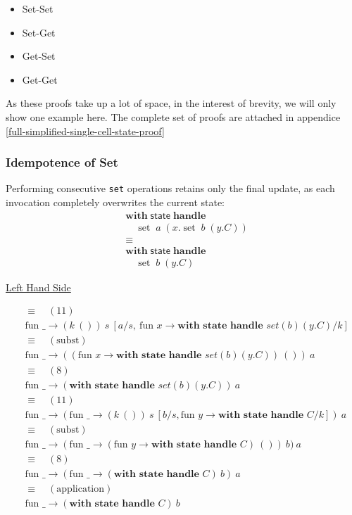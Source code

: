 \documentclass[logo,bsc,singlespacing,parskip]{infthesis}
\begin{document}
\begin{itemize}
    \item Set-Set 
    \item Set-Get
    \item Get-Set
    \item Get-Get
\end{itemize}

As these proofs take up a lot of space, in the interest of brevity, we will only show one example here. The complete set of proofs are attached in appendice \ref{full-simplified-single-cell-state-proof} 

\subsubsection*{Idempotence of Set}
Performing consecutive \lstinline{set} operations retains only the final update, as each invocation completely overwrites the current state:
\[
\begin{aligned}
    &\mathsf{\textbf{with}} \; \mathsf{state} \; \mathsf{\textbf{handle}} \\
    &\quad \operatorname{set} \; a \; (x. \operatorname{set} \; b \; (y. C)) \\
    &\equiv \\
    &\mathsf{\textbf{with}} \; \mathsf{state} \; \mathsf{\textbf{handle}} \\
    &\quad \operatorname{set} \; b \; (y. C)
\end{aligned}
\]

\underline{Left Hand Side}


\begin{align*}
&\equiv\quad (11) \\
&\text{fun } \_ \rightarrow (k\ ())\ s\ [a/s,\ \text{fun } x \rightarrow \textbf{with state handle } set(b)(y.C)/k] \\
&\equiv\quad (\text{subst}) \\
&\text{fun } \_ \rightarrow ((\text{fun } x \rightarrow \textbf{with state handle } set(b)(y.C))\ ())\ a \\
&\equiv\quad (8) \\
&\text{fun } \_ \rightarrow (\textbf{with state handle } set(b)(y.C))\ a \\
&\equiv\quad (11) \\
&\text{fun } \_ \rightarrow (\text{fun } \_ \rightarrow (k\ ())\ s\ [b/s, \text{fun } y \rightarrow \textbf{with state handle } C/k])\ a \\
&\equiv\quad (\text{subst}) \\
&\text{fun } \_ \rightarrow (\text{fun } \_ \rightarrow (\text{fun } y \rightarrow \textbf{with state handle } C)\ ())\ b)\ a \\
&\equiv\quad (8) \\
&\text{fun } \_ \rightarrow (\text{fun } \_ \rightarrow (\textbf{with state handle } C)\ b)\ a \\
&\equiv\quad (\text{application}) \\
&\text{fun } \_ \rightarrow (\textbf{with state handle } C)\ b
\end{align*}
\end{document}
